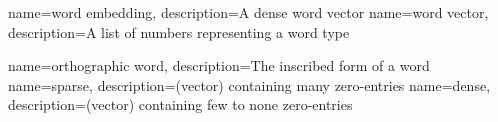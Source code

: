 \makeglossaries

{
    name={word embedding},
    description={A \gls{dense} word vector}
}
{
    name={word vector},
    description={A list of numbers representing a word type}
}

{
    name={orthographic word},
    description={The inscribed form of a word}
}
{
    name=sparse,
    description={(vector) containing many zero-entries}
}
{
    name=dense,
    description={(vector) containing few to none zero-entries}
}
